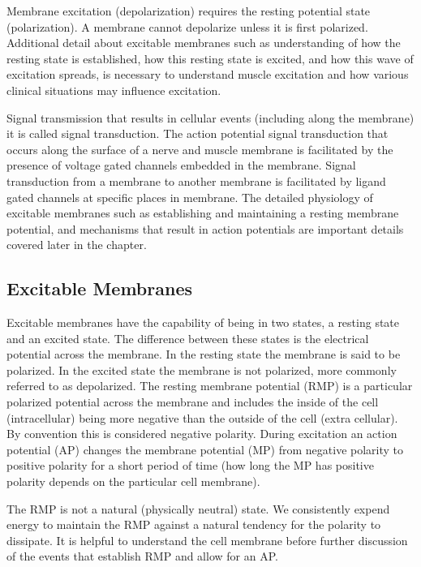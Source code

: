 Membrane excitation (depolarization) requires the resting potential state (polarization). A membrane cannot depolarize unless it is first polarized. Additional detail about excitable membranes such as understanding of how the resting state is established, how this resting state is excited, and how this wave of excitation spreads, is necessary to understand muscle excitation and how various clinical situations may influence excitation.

Signal transmission that results in cellular events (including along the membrane) it is called signal transduction. The action potential signal transduction that occurs along the surface of a nerve and muscle membrane is facilitated by the presence of voltage gated channels embedded in the membrane. Signal transduction from a membrane to another membrane is facilitated by ligand gated channels at specific places in membrane. The detailed physiology of excitable membranes such as establishing and maintaining a resting membrane potential, and mechanisms that result in action potentials are important details covered later in the chapter. 

\subsection{Excitable Membranes}

Excitable membranes have the capability of being in two states, a resting state and an excited state. The difference between these states is the electrical potential across the membrane. In the resting state the membrane is said to be polarized. In the excited state the membrane is not polarized, more commonly referred to as depolarized. The resting membrane potential (RMP) is a particular polarized potential across the membrane and includes the inside of the cell (intracellular) being more negative than the outside of the cell (extra cellular). By convention this is considered negative polarity.\footnotemark{} During excitation an action potential (AP) changes the membrane potential (MP) from negative polarity to positive polarity for a short period of time (how long the MP has positive polarity depends on the particular cell membrane).

The RMP is not a natural (physically neutral) state. We consistently expend energy to maintain the RMP against a natural tendency for the polarity to dissipate. It is helpful to understand the cell membrane before further discussion of the events that establish RMP and allow for an AP.

